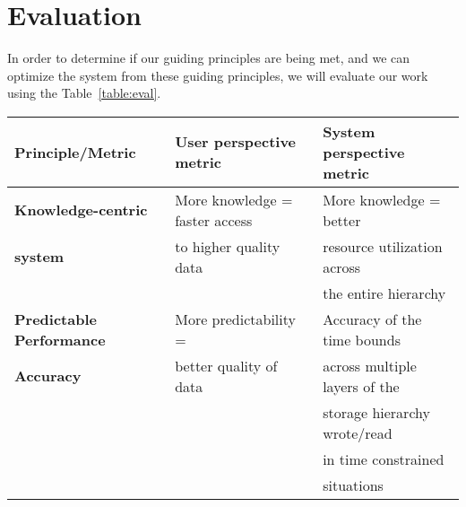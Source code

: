 \section{Evaluation}
\label{sec:evaluation}

In order to determine if our guiding principles are being met, and we can optimize the system from these guiding principles, 
we will evaluate our work using the Table~\ref{table:eval}.
 

\begin{tabular}{ | l | l | l | }

  \hline
  {\bf Principle/Metric}                   & {\bf User perspective metric}   & {\bf System perspective metric }\\ \hline
  {\bf Knowledge-centric}                  & More knowledge = faster access  &  More knowledge = better \\
  {\bf system}                             & to higher quality data          &  resource utilization across \\
                                           &                                 & the entire hierarchy \\ \hline
                                                                                                                                        
                                                                                                                                         
                                                                                                                                             
  {\bf Predictable Performance} & More predictability =                     &  Accuracy of the time bounds \\
  {\bf Accuracy}                & better quality of data                    &  across multiple layers of the\\
                                           &                                           &  storage hierarchy wrote/read \\ 
                                           &                                           &  in time constrained\\
                                           &                                           &  situations \\ \hline
                                                                                                                                         
                                                                                                                                            
\end{tabular}

